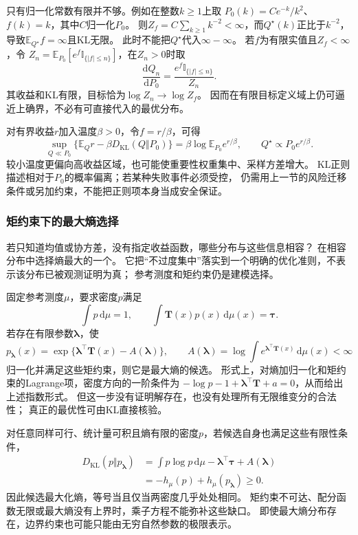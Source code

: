 只有归一化常数有限并不够。例如在整数\(k\geq1\)上取
\(P_0(k)=C e^{-k}/k^2\)、\(f(k)=k\)，其中\(C\)归一化\(P_0\)。
则\(Z_f=C\sum_{k\geq1}k^{-2}<\infty\)，而\(Q^\star(k)\)正比于\(k^{-2}\)，
导致\(\mathbb E_{Q^\star}f=\infty\)且KL无限。
此时不能把\(Q^\star\)代入\(\infty-\infty\)。
若\(f\)为有限实值且\(Z_f<\infty\)，令
\(Z_n=\mathbb E_{P_0}[e^f\mathbb I_{\{|f|\leq n\}}]\)，在\(Z_n>0\)时取
\[
  \frac{\mathrm dQ_n}{\mathrm dP_0}
  =\frac{e^f\mathbb I_{\{|f|\leq n\}}}{Z_n}.
\]
其收益和KL有限，目标恰为\(\log Z_n\to\log Z_f\)。
因而在有限目标定义域上仍可逼近上确界，不必有可直接代入的最优分布。

对有界收益\(r\)加入温度\(\beta>0\)，令\(f=r/\beta\)，可得
\[
  \sup_{Q\ll P_0}\{\mathbb E_Qr-\beta D_{\mathrm{KL}}(Q\Vert P_0)\}
  =\beta\log\mathbb E_{P_0}e^{r/\beta},\qquad
  Q^\star\propto P_0e^{r/\beta}.
\]
较小温度更偏向高收益区域，也可能使重要性权重集中、采样方差增大。
KL正则描述相对于\(P_0\)的概率偏离；若某种失败事件必须受控，
仍需用上一节的风险迁移条件或另加约束，不能把正则项本身当成安全保证。

\subsubsection{矩约束下的最大熵选择}
\label{sec:information-maximum-entropy}

若只知道均值或协方差，没有指定收益函数，哪些分布与这些信息相容？
在相容分布中选择熵最大的一个。
它把“不过度集中”落实到一个明确的优化准则，不表示该分布已被观测证明为真；
参考测度和矩约束仍是建模选择。

固定参考测度\(\mu\)，要求密度\(p\)满足
\[
  \int p\,\mathrm d\mu=1,\qquad
  \int \bm T(x)p(x)\,\mathrm d\mu(x)=\bm\tau.
\]
若存在有限参数\(\bm\lambda\)，使
\[
  p_{\bm\lambda}(x)
  =\exp\{\bm\lambda^\top\bm T(x)-A(\bm\lambda)\},\qquad
  A(\bm\lambda)=\log\int e^{\bm\lambda^\top\bm T(x)}\,\mathrm d\mu(x)<\infty
\]
归一化并满足这些矩约束，则它是最大熵的候选。
形式上，对熵加归一化和矩约束的Lagrange项，密度方向的一阶条件为
\(-\log p-1+\bm\lambda^\top\bm T+a=0\)，从而给出上述指数形式。
但这一步没有证明解存在，也没有处理所有无限维变分的合法性；
真正的最优性可由KL直接核验。

对任意同样可行、统计量可积且熵有限的密度\(p\)，若候选自身也满足这些有限性条件，
\[
\begin{aligned}
  D_{\mathrm{KL}}(p\Vert p_{\bm\lambda})
  &=\int p\log p\,\mathrm d\mu-\bm\lambda^\top\bm\tau+A(\bm\lambda)\\
  &=-h_\mu(p)+h_\mu(p_{\bm\lambda})\geq0.
\end{aligned}
\]
因此候选最大化熵，等号当且仅当两密度几乎处处相同。
矩约束不可达、配分函数无限或最大熵没有上界时，乘子方程不能弥补这些缺口。
即使最大熵分布存在，边界约束也可能只能由无穷自然参数的极限表示。

